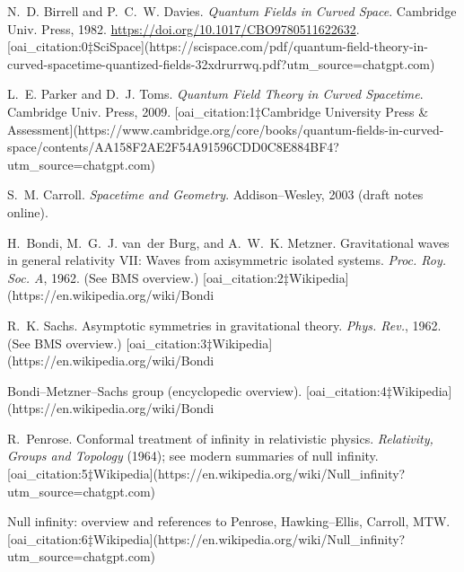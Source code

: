 \documentclass[12pt]{article}
\begin{document}

\begin{thebibliography}{99}

N.~D. Birrell and P.~C.~W. Davies.
\newblock \emph{Quantum Fields in Curved Space}.
\newblock Cambridge Univ. Press, 1982. \url{https://doi.org/10.1017/CBO9780511622632}.  [oai_citation:0‡SciSpace](https://scispace.com/pdf/quantum-field-theory-in-curved-spacetime-quantized-fields-32xdrurrwq.pdf?utm_source=chatgpt.com)

L.~E. Parker and D.~J. Toms.
\newblock \emph{Quantum Field Theory in Curved Spacetime}.
\newblock Cambridge Univ. Press, 2009.  [oai_citation:1‡Cambridge University Press & Assessment](https://www.cambridge.org/core/books/quantum-fields-in-curved-space/contents/AA158F2AE2F54A91596CDD0C8E884BF4?utm_source=chatgpt.com)

S.~M. Carroll.
\newblock \emph{Spacetime and Geometry}.
\newblock Addison–Wesley, 2003 (draft notes online). 

H.~Bondi, M.~G.~J. van~der Burg, and A.~W.~K. Metzner.
\newblock Gravitational waves in general relativity VII: Waves from axisymmetric isolated systems.
\newblock \emph{Proc. Roy. Soc. A}, 1962. (See BMS overview.)  [oai_citation:2‡Wikipedia](https://en.wikipedia.org/wiki/Bondi%

R.~K. Sachs.
\newblock Asymptotic symmetries in gravitational theory.
\newblock \emph{Phys. Rev.}, 1962. (See BMS overview.)  [oai_citation:3‡Wikipedia](https://en.wikipedia.org/wiki/Bondi%

Bondi–Metzner–Sachs group (encyclopedic overview).  [oai_citation:4‡Wikipedia](https://en.wikipedia.org/wiki/Bondi%

R.~Penrose.
\newblock Conformal treatment of infinity in relativistic physics.
\newblock \emph{Relativity, Groups and Topology} (1964); see modern summaries of null infinity.  [oai_citation:5‡Wikipedia](https://en.wikipedia.org/wiki/Null_infinity?utm_source=chatgpt.com)

Null infinity: overview and references to Penrose, Hawking–Ellis, Carroll, MTW.  [oai_citation:6‡Wikipedia](https://en.wikipedia.org/wiki/Null_infinity?utm_source=chatgpt.com)


\end{thebibliography}
\end{document}
